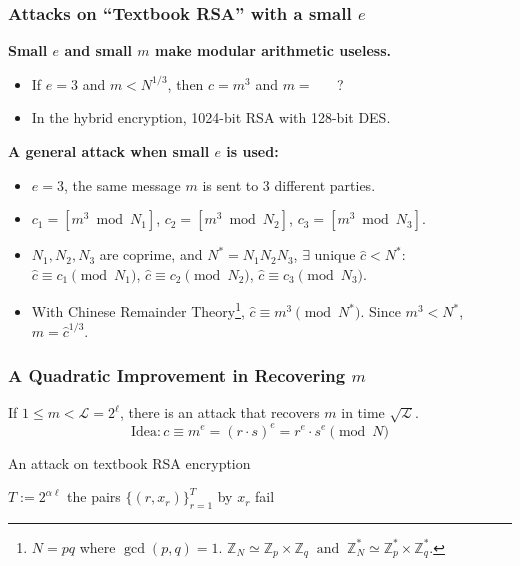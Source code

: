 \begin{frame}\frametitle{Attacks on ``Textbook RSA'' with a small $e$}
\textbf{Small $e$ and small $m$ make modular arithmetic useless.}
\begin{itemize}
\item If $e=3$ and $m < N^{1/3}$, then $c = m^3$ and \alert{$m=$ \underline{$\quad $} ?} %
\item In the hybrid encryption, 1024-bit RSA with 128-bit DES.
\end{itemize}
\textbf{A general attack when small $e$ is used:}
\begin{itemize}
\item $e=3$, the same message $m$ is sent to 3 different parties.
\item $c_1= [ m^3 \bmod N_1]$, $c_2= [ m^3 \bmod N_2]$, $c_3= [ m^3 \bmod N_3]$.
\item $N_1,N_2,N_3$ are coprime, and $N^*=N_1N_2N_3$, $\exists$ unique $\hat{c} < N^*$:\\
$\hat{c} \equiv c_1 \pmod{N_1}$, $\hat{c} \equiv c_2 \pmod{N_2}$, $\hat{c} \equiv c_3 \pmod{N_3}$.
\item With Chinese Remainder Theory\footnote{
$N = pq$ where $\gcd(p,q)=1$.
$\mathbb{Z}_N \simeq \mathbb{Z}_p \times \mathbb{Z}_q\;\;\text{and}\;\;\mathbb{Z}_N^* \simeq \mathbb{Z}_p^* \times \mathbb{Z}_q^* .$
}, $\hat{c} \equiv m^3 \pmod{N^*}$. Since $m^3 < N^*$, $m = \hat{c}^{1/3}$.
\end{itemize}
\end{frame}
\begin{frame}\frametitle{A Quadratic Improvement in Recovering $m$}
If $1 \le m < \mathcal{L} = 2^{\ell}$, there is an attack that recovers $m$  in time $\sqrt{\mathcal{L}}$.
\[ \text{Idea}: c \equiv m^e = (r\cdot s)^e = r^e\cdot s^e \pmod N \]
\begin{algorithm}[H]
\DontPrintSemicolon
\caption{An attack on textbook RSA encryption}
\BlankLine

\KwS $T := 2^{\alpha \ell}$ \;
\KwT the pairs $\{ (r,x_r)\}^T_{r=1}$ by $x_r$\;
\Return fail\;
\end{algorithm}
\end{frame}
